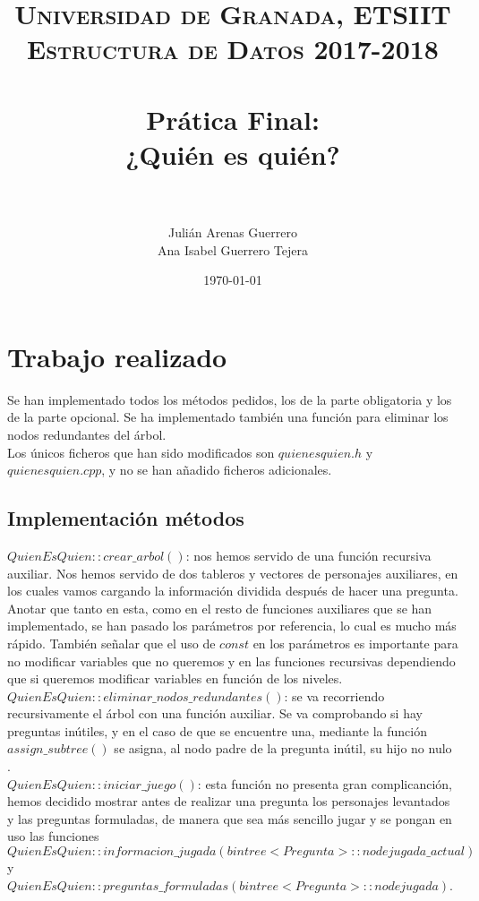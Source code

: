 \documentclass[paper=a4, fontsize=11pt]{scrartcl} %
\title{	
\normalfont \normalsize 
\textsc{Universidad de Granada, ETSIIT \\Estructura de Datos 2017-2018} \\ [25pt] %
\horrule{0.5pt} \\[0.4cm] %
\huge Prática Final:\\¿Quién es quién? \\ %
\horrule{2pt} \\[0.5cm] %
}
\author{Julián Arenas Guerrero\\Ana Isabel Guerrero Tejera} %
\date{\normalsize\today} %
\numberwithin{equation}{section} %
\numberwithin{figure}{section} %
\numberwithin{table}{section} %
\begin{document}
\maketitle %


\section{Trabajo realizado}

Se han implementado todos los métodos pedidos, los de la parte obligatoria y los de la parte opcional. Se ha implementado también una función para eliminar los nodos redundantes del árbol.\\

Los únicos ficheros que han sido modificados son $quienesquien.h$ y $quienesquien.cpp$, y no se han añadido ficheros adicionales.\\

\subsection{Implementación métodos}

$QuienEsQuien::crear\_arbol()$: nos hemos servido de una función recursiva auxiliar. Nos hemos servido de dos tableros y vectores de personajes auxiliares, en los cuales vamos cargando la información dividida después de hacer una pregunta. Anotar que tanto en esta, como en el resto de funciones auxiliares que se han implementado, se han pasado los parámetros por referencia, lo cual es mucho más rápido. También señalar que el uso de $const$ en los parámetros es importante para no modificar variables que no queremos y en las funciones recursivas dependiendo que si queremos modificar variables en función de los niveles.\\

$QuienEsQuien::eliminar\_nodos\_redundantes()$: se va recorriendo recursivamente el árbol con una función auxiliar. Se va comprobando si hay preguntas inútiles, y en el caso de que se encuentre una, mediante la función $assign\_subtree()$ se asigna, al nodo padre de la pregunta inútil, su hijo no nulo .\\

$QuienEsQuien::iniciar\_juego()$: esta función no presenta gran complicanción, hemos decidido mostrar antes de realizar una pregunta los personajes levantados y las preguntas formuladas, de manera que sea más sencillo jugar y se pongan en uso las funciones \\$QuienEsQuien::informacion\_jugada(bintree<Pregunta>::node jugada\_actual)$ y $QuienEsQuien::preguntas\_formuladas(bintree<Pregunta>::node jugada)$.\\
\end{document}
